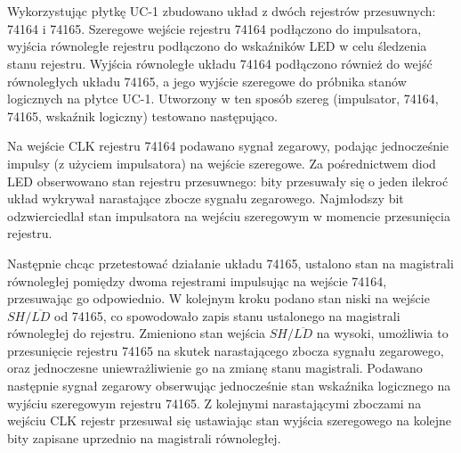 \section{}
Wykorzystując płytkę UC-1 zbudowano układ z dwóch rejestrów przesuwnych: 74164 i 74165.
Szeregowe wejście rejestru 74164 podłączono do impulsatora, wyjścia równoległe rejestru podłączono do wskaźników LED w celu śledzenia stanu rejestru.
Wyjścia równoległe układu 74164 podłączono również do wejść równoległych układu 74165, a jego wyjście szeregowe do próbnika stanów logicznych na płytce UC-1.
Utworzony w ten sposób szereg (impulsator, 74164, 74165, wskaźnik logiczny) testowano następująco.

Na wejście CLK rejestru 74164 podawano sygnał zegarowy, podając jednocześnie impulsy (z użyciem impulsatora) na wejście szeregowe.
Za pośrednictwem diod LED obserwowano stan rejestru przesuwnego: bity przesuwały się o jeden ilekroć układ wykrywał narastające zbocze sygnału zegarowego.
Najmłodszy bit odzwierciedlał stan impulsatora na wejściu szeregowym w momencie przesunięcia rejestru.

Następnie chcąc przetestować działanie układu 74165, ustalono stan na magistrali równoległej pomiędzy dwoma rejestrami impulsując na wejście 74164, przesuwając go odpowiednio.
W kolejnym kroku podano stan niski na wejście \(SH/\overline{LD}\) od 74165, co spowodowało zapis stanu ustalonego na magistrali równoległej do rejestru.
Zmieniono stan wejścia \(SH/\overline{LD}\) na wysoki, umożliwia to przesunięcie rejestru 74165 na skutek narastającego zbocza sygnału zegarowego, oraz jednoczesne uniewrażliwienie go na zmianę stanu magistrali.
Podawano następnie sygnał zegarowy obserwując jednocześnie stan wskaźnika logicznego na wyjściu szeregowym rejestru 74165.
Z kolejnymi narastającymi zboczami na wejściu CLK rejestr przesuwał się ustawiając stan wyjścia szeregowego na kolejne bity zapisane uprzednio na magistrali równoległej.